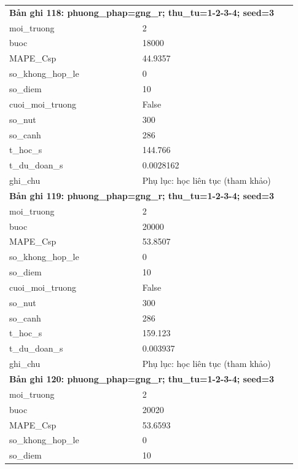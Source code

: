 \begin{longtable}{p{0.43\linewidth}p{0.50\linewidth}}
\midrule
\multicolumn{2}{p{0.95\linewidth}}{\textbf{Bản ghi 118: phuong\_phap=gng\_r; thu\_tu=1-2-3-4; seed=3}} \\
moi\_\allowbreak truong & 2 \\
buoc & 18000 \\
MAPE\_\allowbreak Csp & 44.9357 \\
so\_\allowbreak khong\_\allowbreak hop\_\allowbreak le & 0 \\
so\_\allowbreak diem & 10 \\
cuoi\_\allowbreak moi\_\allowbreak truong & False \\
so\_\allowbreak nut & 300 \\
so\_\allowbreak canh & 286 \\
t\_\allowbreak hoc\_\allowbreak s & 144.766 \\
t\_\allowbreak du\_\allowbreak doan\_\allowbreak s & 0.0028162 \\
ghi\_\allowbreak chu & Phụ lục: học liên tục (tham khảo) \\
\midrule
\multicolumn{2}{p{0.95\linewidth}}{\textbf{Bản ghi 119: phuong\_phap=gng\_r; thu\_tu=1-2-3-4; seed=3}} \\
moi\_\allowbreak truong & 2 \\
buoc & 20000 \\
MAPE\_\allowbreak Csp & 53.8507 \\
so\_\allowbreak khong\_\allowbreak hop\_\allowbreak le & 0 \\
so\_\allowbreak diem & 10 \\
cuoi\_\allowbreak moi\_\allowbreak truong & False \\
so\_\allowbreak nut & 300 \\
so\_\allowbreak canh & 286 \\
t\_\allowbreak hoc\_\allowbreak s & 159.123 \\
t\_\allowbreak du\_\allowbreak doan\_\allowbreak s & 0.003937 \\
ghi\_\allowbreak chu & Phụ lục: học liên tục (tham khảo) \\
\midrule
\multicolumn{2}{p{0.95\linewidth}}{\textbf{Bản ghi 120: phuong\_phap=gng\_r; thu\_tu=1-2-3-4; seed=3}} \\
moi\_\allowbreak truong & 2 \\
buoc & 20020 \\
MAPE\_\allowbreak Csp & 53.6593 \\
so\_\allowbreak khong\_\allowbreak hop\_\allowbreak le & 0 \\
so\_\allowbreak diem & 10 \\

\end{longtable}
